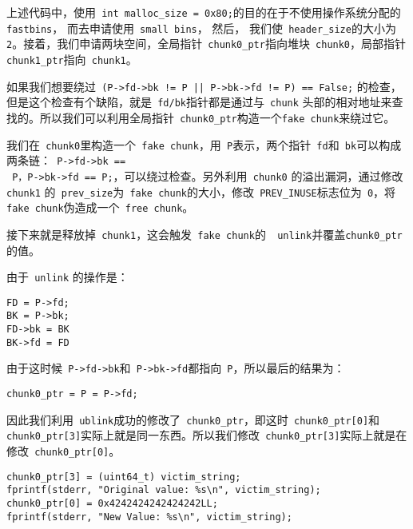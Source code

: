 上述代码中，使用\verb+ int malloc_size = 0x80;+的目的在于不使用操作系统分配的\verb+ fastbins+， 而去申请使用\verb+ small bins+， 然后， 我们使\verb+ header_size+的大小为\verb+ 2+。接着，我们申请两块空间，全局指针\verb+ chunk0_ptr+指向堆块\verb+ chunk0+，局部指针\verb+ chunk1_ptr+指向\verb+ chunk1+。

如果我们想要绕过\verb+ (P->fd->bk != P || P->bk->fd != P) == False;+ 的检查，但是这个检查有个缺陷，就是\verb+ fd/bk+指针都是通过与\verb+ chunk+ 头部的相对地址来查找的。所以我们可以利用全局指针\verb+ chunk0_ptr+构造一个\verb+fake chunk+来绕过它。

我们在\verb+ chunk0+里构造一个\verb+ fake chunk+，用\verb+ P+表示，两个指针\verb+ fd+和\verb+ bk+可以构成两条链：\verb+ P->fd->bk == + \\ \verb+ P，P->bk->fd == P;+，可以绕过检查。另外利用\verb+ chunk0+ 的溢出漏洞，通过修改\verb+ chunk1+ 的\verb+ prev_size+为\verb+ fake chunk+的大小，修改\verb+ PREV_INUSE+标志位为\verb+ 0+，将\verb+ fake chunk+伪造成一个\verb+ free chunk+。

接下来就是释放掉\verb+ chunk1+，这会触发\verb+ fake chunk+的\verb+  unlink+并覆盖\verb+chunk0_ptr+的值。

由于\verb+ unlink+ 的操作是：
\begin{verbatim}
FD = P->fd;
BK = P->bk;
FD->bk = BK
BK->fd = FD
\end{verbatim}

由于这时候\verb+ P->fd->bk+和\verb+ P->bk->fd+都指向\verb+ P+，所以最后的结果为：
\begin{verbatim}
chunk0_ptr = P = P->fd;
\end{verbatim}
因此我们利用\verb+ ublink+成功的修改了\verb+ chunk0_ptr+，即这时\verb+ chunk0_ptr[0]+和\verb+ chunk0_ptr[3]+实际上就是同一东西。所以我们修改\verb+ chunk0_ptr[3]+实际上就是在修改\verb+ chunk0_ptr[0]+。

\begin{verbatim}
chunk0_ptr[3] = (uint64_t) victim_string;
fprintf(stderr, "Original value: %s\n", victim_string);
chunk0_ptr[0] = 0x4242424242424242LL;
fprintf(stderr, "New Value: %s\n", victim_string);
\end{verbatim}

